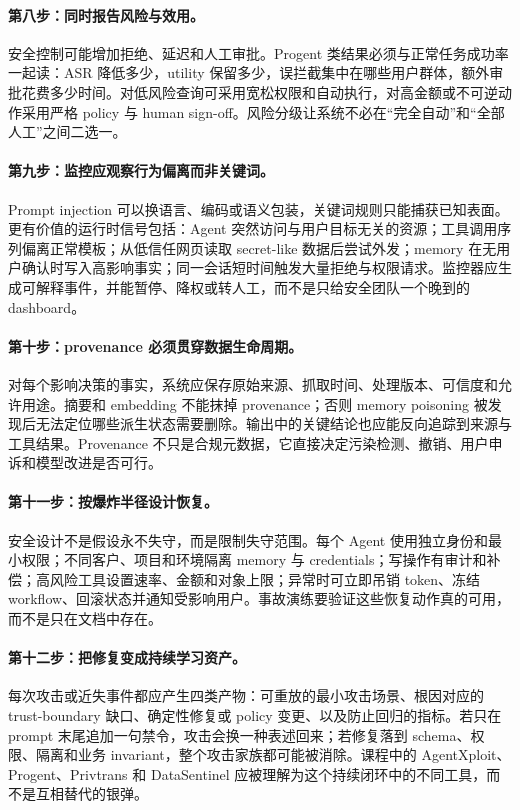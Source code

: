 \paragraph{第八步：同时报告风险与效用。}
安全控制可能增加拒绝、延迟和人工审批。Progent 类结果必须与正常任务成功率一起读：ASR 降低多少，utility 保留多少，误拦截集中在哪些用户群体，额外审批花费多少时间。对低风险查询可采用宽松权限和自动执行，对高金额或不可逆动作采用严格 policy 与 human sign-off。风险分级让系统不必在“完全自动”和“全部人工”之间二选一。

\paragraph{第九步：监控应观察行为偏离而非关键词。}
Prompt injection 可以换语言、编码或语义包装，关键词规则只能捕获已知表面。更有价值的运行时信号包括：Agent 突然访问与用户目标无关的资源；工具调用序列偏离正常模板；从低信任网页读取 secret-like 数据后尝试外发；memory 在无用户确认时写入高影响事实；同一会话短时间触发大量拒绝与权限请求。监控器应生成可解释事件，并能暂停、降权或转人工，而不是只给安全团队一个晚到的 dashboard。

\paragraph{第十步：provenance 必须贯穿数据生命周期。}
对每个影响决策的事实，系统应保存原始来源、抓取时间、处理版本、可信度和允许用途。摘要和 embedding 不能抹掉 provenance；否则 memory poisoning 被发现后无法定位哪些派生状态需要删除。输出中的关键结论也应能反向追踪到来源与工具结果。Provenance 不只是合规元数据，它直接决定污染检测、撤销、用户申诉和模型改进是否可行。

\paragraph{第十一步：按爆炸半径设计恢复。}
安全设计不是假设永不失守，而是限制失守范围。每个 Agent 使用独立身份和最小权限；不同客户、项目和环境隔离 memory 与 credentials；写操作有审计和补偿；高风险工具设置速率、金额和对象上限；异常时可立即吊销 token、冻结 workflow、回滚状态并通知受影响用户。事故演练要验证这些恢复动作真的可用，而不是只在文档中存在。

\paragraph{第十二步：把修复变成持续学习资产。}
每次攻击或近失事件都应产生四类产物：可重放的最小攻击场景、根因对应的 trust-boundary 缺口、确定性修复或 policy 变更、以及防止回归的指标。若只在 prompt 末尾追加一句禁令，攻击会换一种表述回来；若修复落到 schema、权限、隔离和业务 invariant，整个攻击家族都可能被消除。课程中的 AgentXploit、Progent、Privtrans 和 DataSentinel 应被理解为这个持续闭环中的不同工具，而不是互相替代的银弹。

